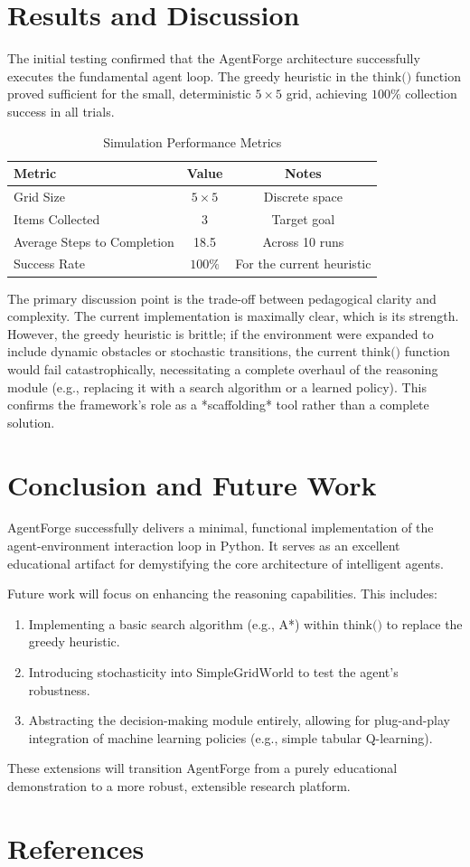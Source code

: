 \documentclass[11pt,a4paper]{article}
\begin{document}
\section{Results and Discussion}
The initial testing confirmed that the AgentForge architecture successfully executes the fundamental agent loop. The greedy heuristic in the $\text{think()}$ function proved sufficient for the small, deterministic $5 \times 5$ grid, achieving $100\%$ collection success in all trials.

\begin{table}[h]
    \centering
    \caption{Simulation Performance Metrics}
    \label{tab:results}
    \begin{tabular}{lcc}
        \toprule
        Metric & Value & Notes \\
        \midrule
        Grid Size & $5 \times 5$ & Discrete space \\
        Items Collected & 3 & Target goal \\
        Average Steps to Completion & 18.5 & Across 10 runs \\
        Success Rate & $100\%$ & For the current heuristic \\
        \bottomrule
    \end{tabular}
\end{table}

The primary discussion point is the trade-off between pedagogical clarity and complexity. The current implementation is maximally clear, which is its strength. However, the greedy heuristic is brittle; if the environment were expanded to include dynamic obstacles or stochastic transitions, the current $\text{think()}$ function would fail catastrophically, necessitating a complete overhaul of the reasoning module (e.g., replacing it with a search algorithm or a learned policy). This confirms the framework's role as a *scaffolding* tool rather than a complete solution.

\section{Conclusion and Future Work}
AgentForge successfully delivers a minimal, functional implementation of the agent-environment interaction loop in Python. It serves as an excellent educational artifact for demystifying the core architecture of intelligent agents.

Future work will focus on enhancing the reasoning capabilities. This includes:
\begin{enumerate}
    \item Implementing a basic search algorithm (e.g., A*) within $\text{think()}$ to replace the greedy heuristic.
    \item Introducing stochasticity into $\text{SimpleGridWorld}$ to test the agent's robustness.
    \item Abstracting the decision-making module entirely, allowing for plug-and-play integration of machine learning policies (e.g., simple tabular Q-learning).
\end{enumerate}
These extensions will transition AgentForge from a purely educational demonstration to a more robust, extensible research platform.

\section*{References}


\end{document}
